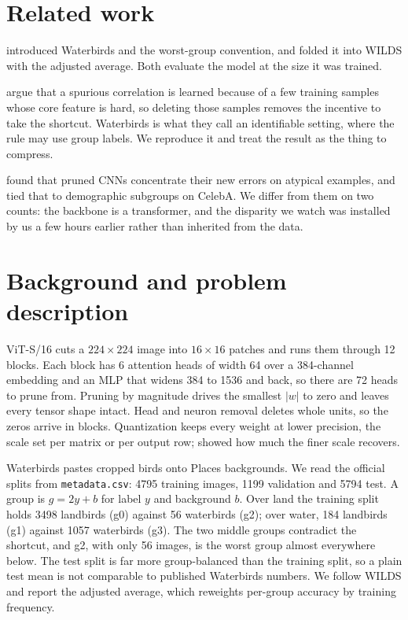 \documentclass[11pt]{article}
\begin{document}
\section{Related work}

\citet{sagawa2020distributionally} introduced Waterbirds and the worst-group
convention, and \citet{koh2021wilds} folded it into WILDS with the adjusted
average. Both evaluate the model at the size it was trained.

\citet{mulchandani2025severing} argue that a spurious correlation is learned
because of a few training samples whose core feature is hard, so deleting
those samples removes the incentive to take the shortcut. Waterbirds is what they call an identifiable setting, where the rule may use
group labels. We reproduce it and treat the result as the thing to compress.

\citet{hooker2019forget} found
that pruned CNNs concentrate their new errors on atypical examples, and
\citet{hooker2020bias} tied that to demographic subgroups on CelebA. We differ
from them on two counts: the backbone is a transformer, and the disparity we
watch was installed by us a few hours earlier rather than inherited from the
data.

\section{Background and problem description} \label{sec:background}

ViT-S/16 \citep{dosovitskiy2021image} cuts a $224 \times 224$ image into
$16 \times 16$ patches and runs them through 12 blocks. Each block has 6
attention heads of width 64 over a 384-channel embedding and an MLP that
widens 384 to 1536 and back, so there are 72 heads to prune from. Pruning by magnitude \citep{han2015learning} drives the
smallest $|w|$ to zero and leaves every tensor shape intact. Head and neuron removal \citep{michel2019sixteen}
deletes whole units, so the zeros arrive in blocks. Quantization
\citep{krishnamoorthi2018quantizing} keeps every weight at lower precision,
the scale set per matrix or per output row;
\citet{krishnamoorthi2018quantizing} showed how much the finer scale recovers.

Waterbirds pastes cropped birds onto Places \citep{zhou2018places}
backgrounds. We read the official splits from \texttt{metadata.csv}: 4795
training images, 1199 validation and 5794 test. A group is $g = 2y + b$ for
label $y$ and background $b$. Over land the training split holds 3498
landbirds (g0) against 56 waterbirds (g2); over water, 184 landbirds (g1)
against 1057 waterbirds (g3). The two middle groups contradict the shortcut,
and g2, with only 56 images, is the worst group almost everywhere below. The test split
is far more group-balanced than the training split, so a plain test mean is
not comparable to published Waterbirds numbers. We follow WILDS and report the
adjusted average, which reweights per-group accuracy by training frequency.
\end{document}
